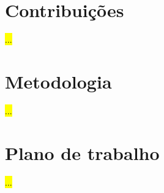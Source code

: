 \section{Contribuições}
\label{sec:chap1_contribuitions}

\hl{...}


\section{Metodologia}
\label{sec:chap1_methodology}

\hl{...}


\section{Plano de trabalho}
\label{sec:chap1_work_plan}

\hl{...}
